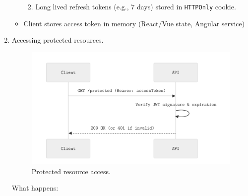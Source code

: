 \documentclass[a4paper,10pt]{article}
\begin{document}
\begin{enumerate}
\begin{itemize}
\begin{enumerate}
\begin{verbatim}
                                \end{verbatim}
                        \item Long lived refresh tokens (e.g., 7 days) stored in \texttt{HTTPOnly} cookie.
                    \end{enumerate}
              \item Client stores access token in memory (React/Vue state, Angular service)
          \end{itemize}
    \item Accessing protected resources.
          \begin{figure}[H]
              \centering
              \includegraphics[width=\textwidth]{images/protected.png}
              \caption{Protected resource access.}
              \label{fig:procted_access}
          \end{figure}

          What happens:


\end{enumerate}
\end{document}
